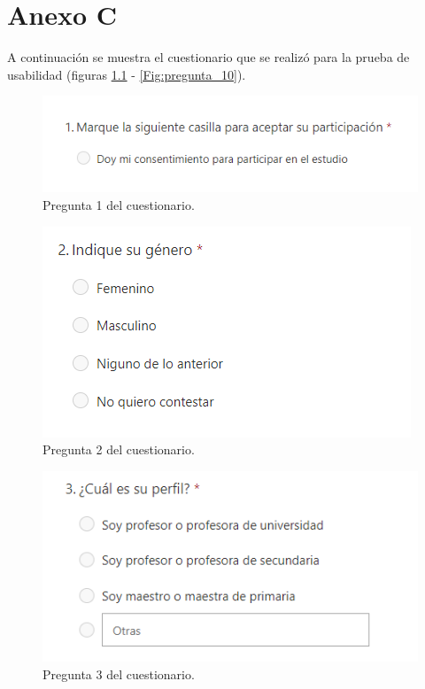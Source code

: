 \chapter{Anexo C}
\label{cap:AnexoC}

A continuación se muestra el cuestionario que se realizó para la prueba de usabilidad (figuras \ref{Fig:pregunta_1} - \ref{Fig:pregunta_10}).

\begin{figure}[h]
\centering\includegraphics[width=0.5\linewidth]{figs/pregunta_1.png}
\caption{Pregunta 1 del cuestionario.}
\label{Fig:pregunta_1}
\end{figure}

\begin{figure}[h]
\centering\includegraphics[width=0.5\linewidth]{figs/pregunta_2.png}
\caption{Pregunta 2 del cuestionario.}
\label{Fig:pregunta_2}
\end{figure}

\begin{figure}[h]
\centering\includegraphics[width=0.5\linewidth]{figs/pregunta_3.png}
\caption{Pregunta 3 del cuestionario.}
\label{Fig:pregunta_3}
\end{figure}

